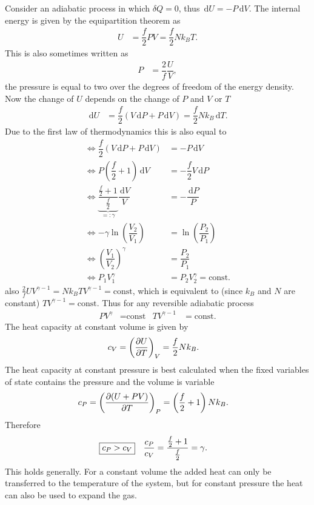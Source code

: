 \documentclass[a4paper,10pt]{article}
\newcommand{\td}{\,\text{d}}
\numberwithin{equation}{section}
\begin{document}
\begin{multicols}{2}
Consider an adiabatic process in which $\delta Q=0$, thus $\td U=-P\td V$.
The internal energy is given by the equipartition theorem as
\begin{align} 
  U &= \dfrac{f}{2}PV = \dfrac{f}{2}Nk_BT
.\end{align} 
This is also sometimes written as
\begin{align} 
  P &= \dfrac{2}{f}\dfrac{U}{V}
,\end{align} 
the pressure is equal to two over the degrees of freedom of the energy density.
Now the change of $U$ depends on the change of $P$ and $V$ or $T$
\begin{align} 
  \td U &= \dfrac{f}{2}\left(V\td P + P\td V\right) = \dfrac{f}{2}Nk_B\td T
.\end{align} 
Due to the first law of thermodynamics this is also equal to
\begin{align} 
  \Leftrightarrow \dfrac{f}{2}(V\td P + P\td V) &= -P\td V \\
  \Leftrightarrow P\left(\dfrac{f}{2}+1\right)\td V &= -\dfrac{f}{2}V\td P\\
  \Leftrightarrow \underbrace{\dfrac{\tfrac{f}{2}+1}{\tfrac{f}{2} }}_{=:\gamma }\dfrac{\td V}{V} &= -\dfrac{\td P}{P}\\
  \Leftrightarrow -\gamma \ln\left(\dfrac{V_2}{V_1}\right) &= \ln\left(\dfrac{P_2}{P_1}\right)\\
  \Leftrightarrow \left(\dfrac{V_1}{V_2}\right)^{\gamma } &= \dfrac{P_2}{P_1}\\
  \Leftrightarrow P_1V_1^\gamma  &= P_2V_2^\gamma =\text{const}
.\end{align} 
also $\tfrac{2}{f}UV^{\gamma -1}=Nk_BTV^{\gamma -1}=\text{const}$, which is equivalent to (since $k_B$ and $N$ are constant) $TV^{\gamma -1}=\text{const}$.
Thus for any reversible adiabatic process
\begin{align} 
  PV^\gamma  &= \text{const} & TV^{\gamma -1} &= \text{const}
.\end{align} 
The heat capacity at constant volume is given by
\begin{align} 
  c_V &= \left(\diffp[]{U}{T}\right)_V = \dfrac{f}{2}Nk_B
.\end{align} 
The heat capacity at constant pressure is best calculated when the fixed variables of state contains the pressure and the volume is variable
\begin{align} 
  c_P &= \left(\diffp[]{(U+PV)}{T}\right)_P = \left(\dfrac{f}{2}+1\right)Nk_B
.\end{align} 
Therefore
\begin{align} 
  \Aboxed{c_P&>c_V} & \dfrac{c_P}{c_V}&=\dfrac{\tfrac{f}{2}+1}{\tfrac{f}{2}}=\gamma 
.\end{align} 
This holds generally.
For a constant volume the added heat can only be transferred to the temperature of the system, but for constant pressure the heat can also be used to expand the gas.


\end{multicols}
\end{document}

